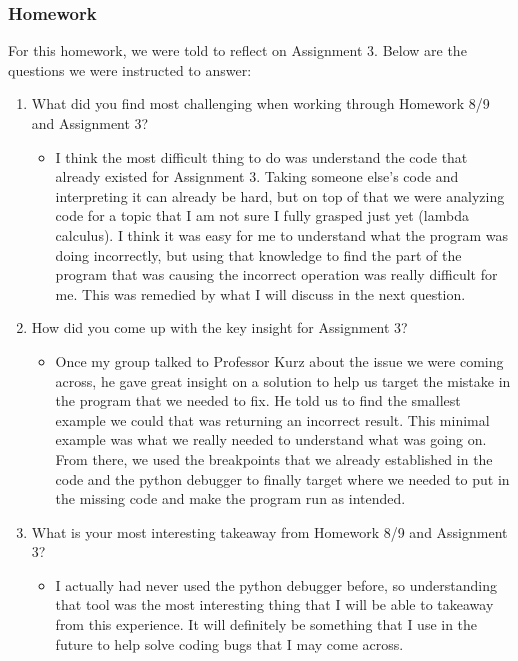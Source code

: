 \documentclass{article}
\theoremstyle{theorem}
\theoremstyle{definition}
\theoremstyle{remark}
\begin{document}
\subsubsection*{Homework}
For this homework, we were told to reflect on Assignment 3.
Below are the questions we were instructed to answer:
\begin{enumerate}
  \item What did you find most challenging when working through Homework 8/9 and Assignment 3?
    \begin{itemize}
      \item I think the most difficult thing to do was understand the code that already existed for Assignment 3. 
      Taking someone else's code and interpreting it can already be hard, but on top of that we were analyzing code
      for a topic that I am not sure I fully grasped just yet (lambda calculus). I think it was easy for me to understand
      what the program was doing incorrectly, but using that knowledge to find the part of the program that was causing
      the incorrect operation was really difficult for me. This was remedied by what I will discuss in the next
      question. 
    \end{itemize}
    \item How did you come up with the key insight for Assignment 3?
    \begin{itemize}
      \item Once my group talked to Professor Kurz about the issue we were coming across, he gave great insight on a solution
      to help us target the mistake in the program that we needed to fix. He told us to find the smallest example we could that
      was returning an incorrect result. This minimal example was what we really needed to understand what was going on. From there,
      we used the breakpoints that we already established in the code and the python debugger to finally target where we needed to
      put in the missing code and make the program run as intended.
    \end{itemize}
    \item What is your most interesting takeaway from Homework 8/9 and Assignment 3?
    \begin{itemize}
      \item I actually had never used the python debugger before, so understanding that tool was the most interesting 
      thing that I will be able to takeaway from this experience. It will definitely be something that I use in the
      future to help solve coding bugs that I may come across.
    \end{itemize}
\end{enumerate}
\end{document}
